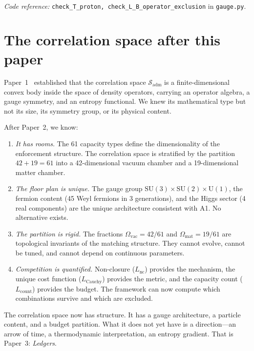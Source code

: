 \documentclass[11pt]{article}
\newcommand{\coderef}[2]{\smallskip\noindent\textit{Code reference:} \texttt{#1} in \texttt{#2}.}
\newcommand{\SU}{\mathrm{SU}}
\newcommand{\U}{\mathrm{U}}
\begin{document}
\coderef{check\_T\_proton, check\_L\_B\_operator\_exclusion}{gauge.py}



\section{The correlation space after this paper}
\label{sec:corr_space}

Paper~1~\cite{BrookePaper1} established that the correlation space $\mathcal{S}_{\mathrm{adm}}$ is a finite-dimensional convex body inside the space of density operators, carrying an operator algebra, a gauge symmetry, and an entropy functional.  We knew its mathematical type but not its size, its symmetry group, or its physical content.

After Paper~2, we know:

\begin{enumerate}
\item \textit{It has rooms.}  The 61 capacity types define the dimensionality of the enforcement structure.  The correlation space is stratified by the partition $42 + 19 = 61$ into a 42-dimensional vacuum chamber and a 19-dimensional matter chamber.

\item \textit{The floor plan is unique.}  The gauge group $\SU(3) \times \SU(2) \times \U(1)$, the fermion content (45 Weyl fermions in 3 generations), and the Higgs sector (4 real components) are the unique architecture consistent with A1.  No alternative exists.

\item \textit{The partition is rigid.}  The fractions $\Omega_{\mathrm{vac}} = 42/61$ and $\Omega_{\mathrm{mat}} = 19/61$ are topological invariants of the matching structure.  They cannot evolve, cannot be tuned, and cannot depend on continuous parameters.

\item \textit{Competition is quantified.}  Non-closure ($L_{\mathrm{nc}}$) provides the mechanism, the unique cost function ($L_{\mathrm{Cauchy}}$) provides the metric, and the capacity count ($L_{\mathrm{count}}$) provides the budget.  The framework can now compute which combinations survive and which are excluded.
\end{enumerate}

The correlation space now has structure.  It has a gauge architecture, a particle content, and a budget partition.  What it does not yet have is a direction---an arrow of time, a thermodynamic interpretation, an entropy gradient.  That is Paper~3: \emph{Ledgers}.
\end{document}
